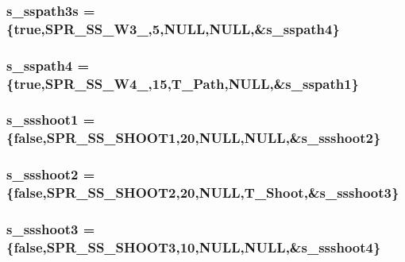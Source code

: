 \label{WL__ACT2_8C_ad232b5fa4d37725d0cad265b0882032f}
\hypertarget{WL__ACT2_8C_aba1afc219ee599720058c7f2e6e65e7e}{
\subsubsection[{s\_\-sspath3s}]{ {\bf s\_\-sspath3s} = \{true,SPR\_\-SS\_\-W3\_,5,NULL,NULL,\&{\bf s\_\-sspath4}\}}}
\label{WL__ACT2_8C_aba1afc219ee599720058c7f2e6e65e7e}
\hypertarget{WL__ACT2_8C_a8ff64b310cfc203d5f647fefbec4d417}{
\subsubsection[{s\_\-sspath4}]{ {\bf s\_\-sspath4} = \{true,SPR\_\-SS\_\-W4\_,15,T\_\-Path,NULL,\&{\bf s\_\-sspath1}\}}}
\label{WL__ACT2_8C_a8ff64b310cfc203d5f647fefbec4d417}
\hypertarget{WL__ACT2_8C_ab84ec28c4a3bedd5c47e7f52ff210dec}{
\subsubsection[{s\_\-ssshoot1}]{ {\bf s\_\-ssshoot1} = \{false,SPR\_\-SS\_\-SHOOT1,20,NULL,NULL,\&{\bf s\_\-ssshoot2}\}}}
\label{WL__ACT2_8C_ab84ec28c4a3bedd5c47e7f52ff210dec}
\hypertarget{WL__ACT2_8C_adefa962185ee8059a6de842d0fd2da10}{
\subsubsection[{s\_\-ssshoot2}]{ {\bf s\_\-ssshoot2} = \{false,SPR\_\-SS\_\-SHOOT2,20,NULL,T\_\-Shoot,\&{\bf s\_\-ssshoot3}\}}}
\label{WL__ACT2_8C_adefa962185ee8059a6de842d0fd2da10}
\hypertarget{WL__ACT2_8C_ab375d6f13bacc2be512c19659bf7ba19}{
\subsubsection[{s\_\-ssshoot3}]{ {\bf s\_\-ssshoot3} = \{false,SPR\_\-SS\_\-SHOOT3,10,NULL,NULL,\&{\bf s\_\-ssshoot4}\}}}
